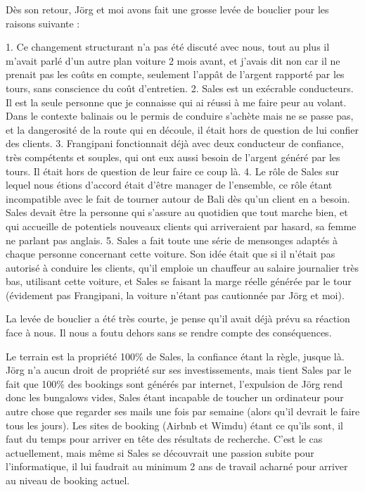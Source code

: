 Dès son retour, Jörg et moi avons fait une grosse levée de bouclier pour les raisons suivante :

1. Ce changement structurant n’a pas été discuté avec nous, tout au plus il m’avait parlé d’un autre plan voiture 2 mois avant, et j’avais dit non car il ne prenait pas les coûts en compte, seulement l’appât de l’argent rapporté par les tours, sans conscience du coût d’entretien.
2. Sales est un exécrable conducteurs. Il est la seule personne que je connaisse qui ai réussi à me faire peur au volant. Dans le contexte balinais ou le permis de conduire s’achète mais ne se passe pas, et la dangerosité de la route qui en découle, il était hors de question de lui confier des clients.
3. Frangipani fonctionnait déjà avec deux conducteur de confiance, très compétents et souples, qui ont eux aussi besoin de l’argent généré par les tours. Il était hors de question de leur faire ce coup là.
4. Le rôle de Sales sur lequel nous étions d’accord était d’être manager de l’ensemble, ce rôle étant incompatible avec le fait de tourner autour de Bali dès qu’un client en a besoin. Sales devait être la personne qui s’assure au quotidien que tout marche bien, et qui accueille de potentiels nouveaux clients qui arriveraient par hasard, sa femme ne parlant pas anglais.
5. Sales a fait toute une série de mensonges adaptés à chaque personne concernant cette voiture. Son idée était que si il n’était pas autorisé à conduire les clients, qu’il emploie un chauffeur au salaire journalier très bas, utilisant cette voiture, et Sales se faisant la marge réelle générée par le tour (évidement pas Frangipani, la voiture n’étant pas cautionnée par Jörg et moi).

La levée de bouclier a été très courte, je pense qu’il avait déjà prévu sa réaction face à nous. Il nous a foutu dehors sans se rendre compte des conséquences.

Le terrain est la propriété 100\% de Sales, la confiance étant la règle, jusque là. Jörg n’a aucun droit de propriété sur ses investissements, mais tient Sales par le fait que 100\% des bookings sont générés par internet, l’expulsion de Jörg rend donc les bungalows vides, Sales étant incapable de toucher un ordinateur pour autre chose que regarder ses mails une fois par semaine (alors qu’il devrait le faire tous les jours). Les sites de booking (Airbnb et Wimdu) étant ce qu’ils sont, il faut du temps pour arriver en tête des résultats de recherche. C'est le cas actuellement, mais même si Sales se découvrait une passion subite pour l’informatique, il lui faudrait au minimum 2 ans de travail acharné pour arriver au niveau de booking actuel.

